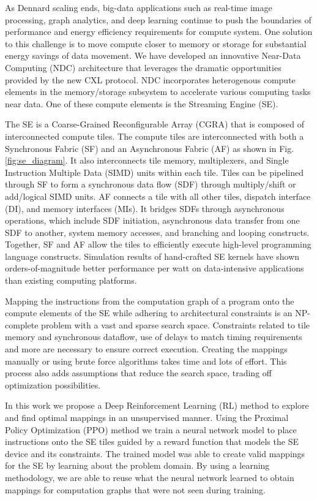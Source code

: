 As Dennard scaling ends, big-data applications such as real-time image processing, graph analytics, and deep learning continue to push the boundaries of performance and energy efficiency requirements for compute system. 
One solution to this challenge is to move compute closer to memory or storage for substantial energy savings of data movement. 
We have developed an innovative Near-Data Computing (NDC) architecture that leverages the dramatic opportunities provided by the new CXL protocol. 
NDC incorporates heterogenous compute elements in the memory/storage subsystem to accelerate various computing tasks near data. 
One of these compute elements is the Streaming Engine (SE).

The SE is a Coarse-Grained Reconfigurable Array (CGRA) that is composed of interconnected compute tiles.  
The compute tiles are interconnected with both a Synchronous Fabric (SF) and an Asynchronous Fabric (AF) as shown in Fig. \ref{fig:se_diagram}.
It also interconnects tile memory, multiplexers, and Single Instruction Multiple Data (SIMD) units within each tile. 
Tiles can be pipelined through SF to form a synchronous data flow (SDF) through multiply/shift or add/logical SIMD units. 
AF connects a tile with all other tiles, dispatch interface (DI), and memory interfaces (MIs). 
It bridges SDFs through asynchronous operations, which include SDF initiation, asynchronous data transfer from one SDF to another, system memory accesses, and branching and looping constructs. 
Together, SF and AF allow the tiles to efficiently execute high-level programming language constructs. 
Simulation results of hand-crafted SE kernels have shown orders-of-magnitude better performance per watt on data-intensive applications than existing computing platforms.

Mapping the instructions from the computation graph of a program onto the compute elements of the SE while adhering to architectural constraints is an NP-complete problem with a vast and sparse search space. 
Constraints related to tile memory and synchronous dataflow, use of delays to match timing requirements and more are necessary to ensure correct execution. 
Creating the mappings manually or using brute force algorithms takes time and lots of effort. 
This process also adds assumptions that reduce the search space, trading off optimization possibilities.  

In this work we propose a Deep Reinforcement Learning (RL) method to explore and find optimal mappings in an unsupervised manner. 
Using the Proximal Policy Optimization (PPO) method we train a neural network model to place instructions onto the SE tiles guided by a reward function that models the SE device and its constraints. 
The trained model was able to create valid mappings for the SE by learning about the problem domain. 
By using a learning methodology, we are able to reuse what the neural network learned to obtain mappings for computation graphs that were not seen during training.  

